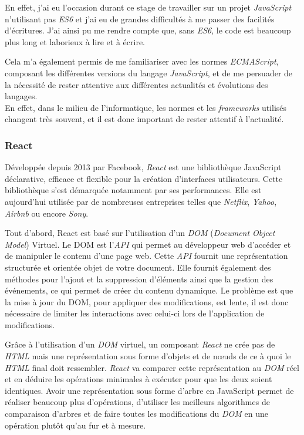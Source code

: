 \documentclass[12pt,a4paper]{article}
\begin{document}
  \bigskip

  En effet, j'ai eu l'occasion durant ce stage de travailler sur un projet
  \emph{JavaScript} n'utilisant pas \emph{ES6} et j'ai eu de grandes
  difficultés à me passer des facilités d'écritures. J'ai ainsi pu me
  rendre compte que, sans \emph{ES6}, le code est beaucoup plus long et
  laborieux à lire et à écrire.

  \bigskip

  Cela m'a également permis de me familiariser avec les normes
  \emph{ECMAScript}, composant les différentes versions du langage
  \emph{JavaScript}, et de me persuader de la nécessité de rester
  attentive aux différentes actualités et évolutions des langages.\\
  En effet, dans le milieu de l'informatique, les normes et les
  \emph{frameworks} utilisés changent très souvent, et il est donc
  important de rester attentif à l'actualité.

  \bigskip

  \subsubsection{React}\label{react}

  \bigskip

  Développée depuis 2013 par Facebook, \emph{React} est une bibliothèque
  JavaScript déclarative, efficace et flexible pour la création
  d'interfaces utilisateurs. Cette bibliothèque s'est démarquée notamment
  par ses performances. Elle est aujourd'hui utilisée par de nombreuses
  entreprises telles que \emph{Netflix}, \emph{Yahoo}, \emph{Airbnb} ou
  encore \emph{Sony}.

  \bigskip

  Tout d'abord, React est basé sur l'utilisation d'un \emph{DOM}
  (\emph{Document Object Model}) Virtuel. Le DOM est l'\emph{API} qui
  permet au développeur web d'accéder et de manipuler le contenu d'une
  page web. Cette \emph{API} fournit une représentation structurée et
  orientée objet de votre document. Elle fournit également des méthodes
  pour l'ajout et la suppression d'éléments ainsi que la gestion des
  événements, ce qui permet de créer du contenu dynamique. Le problème est
  que la mise à jour du DOM, pour appliquer des modifications, est lente,
  il est donc nécessaire de limiter les interactions avec celui-ci lors de
  l'application de modifications. \bigskip

  Grâce à l'utilisation d'un \emph{DOM} virtuel, un composant \emph{React}
  ne crée pas de \emph{HTML} mais une représentation sous forme d'objets
  et de nœuds de ce à quoi le \emph{HTML} final doit ressembler.
  \emph{React} va comparer cette représentation au \emph{DOM} réel et en
  déduire les opérations minimales à exécuter pour que les deux soient
  identiques. Avoir une représentation sous forme d'arbre en JavaScript
  permet de réaliser beaucoup plus d'opérations, d'utiliser les meilleurs
  algorithmes de comparaison d'arbres et de faire toutes les modifications
  du \emph{DOM} en une opération plutôt qu'au fur et à mesure.
\end{document}
